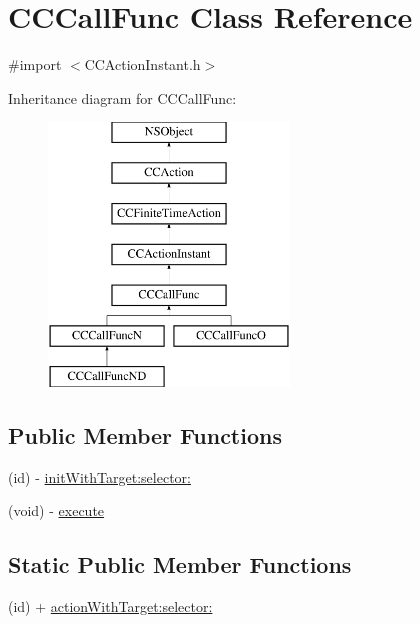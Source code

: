 \hypertarget{interface_c_c_call_func}{\section{C\-C\-Call\-Func Class Reference}
\label{interface_c_c_call_func}
}


{\ttfamily \#import $<$C\-C\-Action\-Instant.\-h$>$}

Inheritance diagram for C\-C\-Call\-Func\-:\begin{figure}[H]
\begin{center}
\leavevmode
\includegraphics[height=7.000000cm]{interface_c_c_call_func}
\end{center}
\end{figure}
\subsection*{Public Member Functions}
\begin{DoxyCompactItemize}
\item 
(id) -\/ \hyperlink{interface_c_c_call_func_a8757e74e58a9e163e087c66a5eec4c60}{init\-With\-Target\-:selector\-:}
\item 
(void) -\/ \hyperlink{interface_c_c_call_func_ab2a87767fa9a0cd2dbf1a49bb4f04d94}{execute}
\end{DoxyCompactItemize}
\subsection*{Static Public Member Functions}
\begin{DoxyCompactItemize}
\item 
(id) + \hyperlink{interface_c_c_call_func_a054440f71d690783f745bc7e17635f8f}{action\-With\-Target\-:selector\-:}
\end{DoxyCompactItemize}
